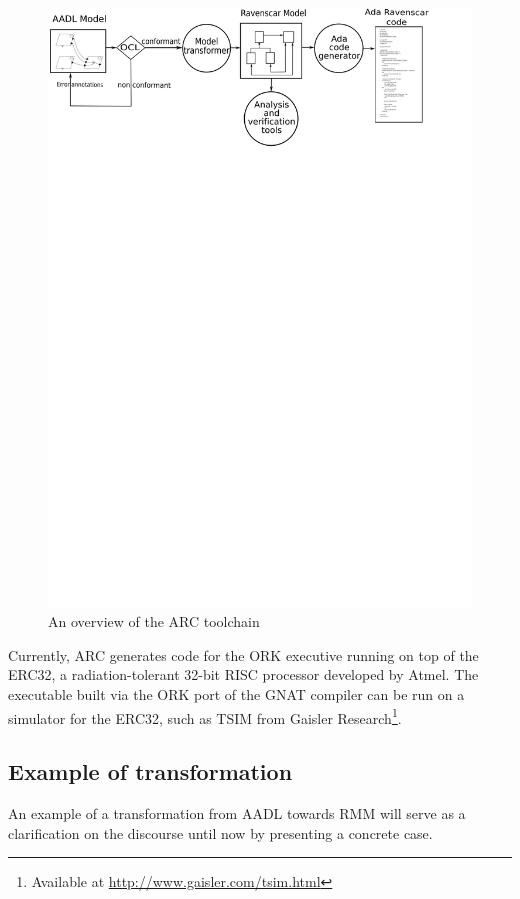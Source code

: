 \begin{figure}
\centering
\includegraphics[scale=0.6]{figs/ARC_process}
\caption{An overview of the ARC toolchain}
\label{fig:arc_process}
\end{figure}

Currently, ARC generates code for the ORK executive running on top of
the ERC32, a radiation-tolerant 32-bit RISC processor developed by
Atmel\circledR. The executable built via the ORK port of the GNAT
compiler can be run on a simulator for the ERC32, such as TSIM from
Gaisler Research\footnote{Available at
  \url{http://www.gaisler.com/tsim.html}}.

\subsection{Example of transformation}
An example of a transformation from AADL towards RMM will serve as a
clarification on the discourse until now by presenting a concrete case.

